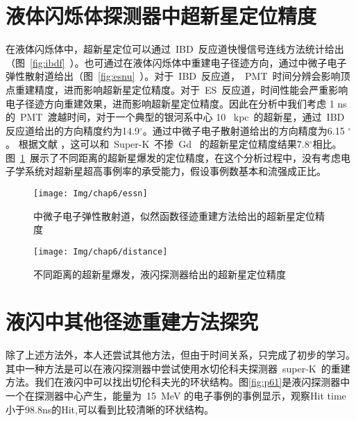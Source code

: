 \section{液体闪烁体探测器中超新星定位精度}
在液体闪烁体中，超新星定位可以通过~IBD~反应道快慢信号连线方法统计给出（图~\ref{fig:ibdf}~）。也可通过在液体闪烁体中重建电子径迹方向，通过中微子电子弹性散射道给出（图~\ref{fig:esnu}~）。对于~IBD~反应道，~PMT~时间分辨会影响顶点重建精度，进而影响超新星定位精度。对于~ES~反应道，时间性能会严重影响电子径迹方向重建效果，进而影响超新星定位精度。因此在分析中我们考虑 1 ns的~PMT~渡越时间，对于一个典型的银河系中心 10 ~kpc~的超新星，通过~IBD~ 反应道给出的方向精度约为14.9$^{\circ}$。通过中微子电子散射道给出的方向精度为6.15 $^{\circ}$。 根据文献 \citep{tomas2003supernova}，这可以和~Super-K~不掺~Gd~ 的超新星定位精度结果7.8$^{\circ}$相比。图~\ref{fig:distance}~展示了不同距离的超新星爆发的定位精度，在这个分析过程中，没有考虑电子学系统对超新星超高事例率的承受能力，假设事例数基本和流强成正比。
\begin{figure}[!htbp]
\begin{minipage}[t]{0.48\linewidth}
  \centering
   \texttt{[image: Img/chap6/essn]}
    \caption{ 中微子电子弹性散射道，似然函数径迹重建方法给出的超新星定位精度}
  \label{fig:esnu}
  \end{minipage}
 \quad\quad
  \begin{minipage}[t]{0.48\linewidth}
  \centering
   \texttt{[image: Img/chap6/distance]}
    \caption{不同距离的超新星爆发，液闪探测器给出的超新星定位精度}
  \label{fig:distance}
    \end{minipage}
\end{figure}
\section{液闪中其他径迹重建方法探究}
除了上述方法外，本人还尝试其他方法，但由于时间关系，只完成了初步的学习。其中一种方法是可以在液闪探测器中尝试使用水切伦科夫探测器~super-K~的重建方法。我们在液闪中可以找出切伦科夫光的环状结构。图\ref{fig:p61}是液闪探测器中一个在探测器中心产生，能量为~15~MeV 的电子事例的事例显示，观察Hit time 小于98.8ns的Hit,可以看到比较清晰的环状结构。%

